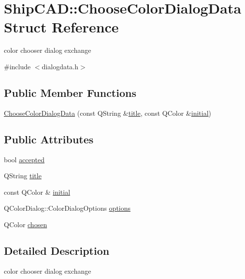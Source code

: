 \hypertarget{structShipCAD_1_1ChooseColorDialogData}{}\section{Ship\+C\+AD\+:\+:Choose\+Color\+Dialog\+Data Struct Reference}
\label{structShipCAD_1_1ChooseColorDialogData}


color chooser dialog exchange  




{\ttfamily \#include $<$dialogdata.\+h$>$}

\subsection*{Public Member Functions}
\begin{DoxyCompactItemize}
\item 
\hyperlink{structShipCAD_1_1ChooseColorDialogData_a5d0e08fd563445cda2b5d375dfbce127}{Choose\+Color\+Dialog\+Data} (const Q\+String \&\hyperlink{structShipCAD_1_1ChooseColorDialogData_aedfb5ee0ef99d57837d728a477303d0b}{title}, const Q\+Color \&\hyperlink{structShipCAD_1_1ChooseColorDialogData_a63bc2080dc3d30fe9a448df004410c8b}{initial})
\end{DoxyCompactItemize}
\subsection*{Public Attributes}
\begin{DoxyCompactItemize}
\item 
bool \hyperlink{structShipCAD_1_1ChooseColorDialogData_a5b600a941ccefec026e59e7d65caff63}{accepted}
\item 
Q\+String \hyperlink{structShipCAD_1_1ChooseColorDialogData_aedfb5ee0ef99d57837d728a477303d0b}{title}
\item 
const Q\+Color \& \hyperlink{structShipCAD_1_1ChooseColorDialogData_a63bc2080dc3d30fe9a448df004410c8b}{initial}
\item 
Q\+Color\+Dialog\+::\+Color\+Dialog\+Options \hyperlink{structShipCAD_1_1ChooseColorDialogData_ad0a90945a5a1942d892ca3a06dbd6545}{options}
\item 
Q\+Color \hyperlink{structShipCAD_1_1ChooseColorDialogData_afa2fd53ceaab239e68818cb93463e247}{chosen}
\end{DoxyCompactItemize}


\subsection{Detailed Description}
color chooser dialog exchange 

